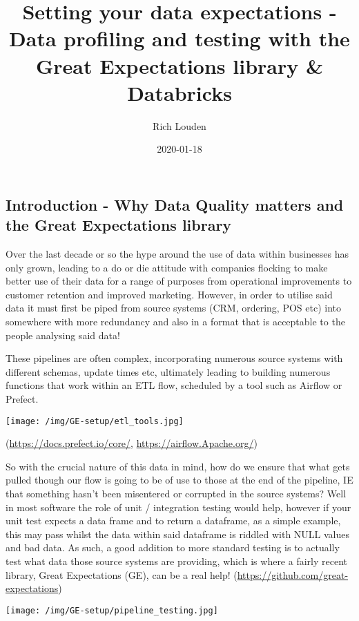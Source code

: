 \documentclass[]{article}
\title{Setting your data expectations - Data profiling and testing with the
Great Expectations library \& Databricks}
\author{Rich Louden}
\date{2020-01-18}
\begin{document}
\maketitle

\hypertarget{introduction---why-data-quality-matters-and-the-great-expectations-library}{%
\subsection{Introduction - Why Data Quality matters and the Great
Expectations
library}\label{introduction---why-data-quality-matters-and-the-great-expectations-library}}

Over the last decade or so the hype around the use of data within
businesses has only grown, leading to a do or die attitude with
companies flocking to make better use of their data for a range of
purposes from operational improvements to customer retention and
improved marketing. However, in order to utilise said data it must first
be piped from source systems (CRM, ordering, POS etc) into somewhere
with more redundancy and also in a format that is acceptable to the
people analysing said data!

These pipelines are often complex, incorporating numerous source systems
with different schemas, update times etc, ultimately leading to building
numerous functions that work within an ETL flow, scheduled by a tool
such as Airflow or Prefect.

\texttt{[image: /img/GE-setup/etl\_tools.jpg]}

(\url{https://docs.prefect.io/core/}, \url{https://airflow.Apache.org/})

So with the crucial nature of this data in mind, how do we ensure that
what gets pulled though our flow is going to be of use to those at the
end of the pipeline, IE that something hasn't been misentered or
corrupted in the source systems? Well in most software the role of unit
/ integration testing would help, however if your unit test expects a
data frame and to return a dataframe, as a simple example, this may pass
whilst the data within said dataframe is riddled with NULL values and
bad data. As such, a good addition to more standard testing is to
actually test what data those source systems are providing, which is
where a fairly recent library, Great Expectations (GE), can be a real
help! (\url{https://github.com/great-expectations})

\texttt{[image: /img/GE-setup/pipeline\_testing.jpg]}
\end{document}
